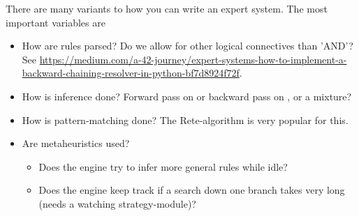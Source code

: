 There are many variants to how you can write an expert system. 
The most important variables are 
\begin{itemize}
	\item How are rules parsed? Do we allow for other logical connectives than 'AND'? See \href{this example}{https://medium.com/a-42-journey/expert-systems-how-to-implement-a-backward-chaining-resolver-in-python-bf7d8924f72f}.
	\item How is inference done? Forward pass on  or backward pass on , or a mixture? 
	\item How is pattern-matching done? The Rete-algorithm is very popular for this.
	\item Are metaheuristics used? 
		\begin{itemize}
			\item Does the engine try to infer more general rules while idle? 
			\item Does the engine keep track if a search down one branch takes very long (needs a watching strategy-module)?
		\end{itemize}
\end{itemize}

